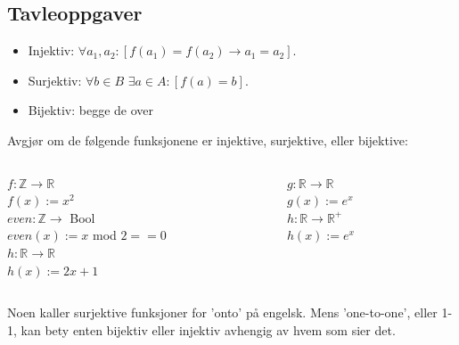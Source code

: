 \subsection{Tavleoppgaver}
\begin{frame} %
    \begin{itemize}
        \item Injektiv:  $\forall a_1, a_2 : [f(a_1) = f(a_2) \rightarrow a_1 = a_2]$.\\
        \item Surjektiv: $\forall b \in B$  $\exists a \in A : [f(a) = b]$.\\
        \item Bijektiv: begge de over \\
    \end{itemize}
    \pause
    \begin{block}{Avgjør om de følgende funksjonene er injektive, surjektive, eller bijektive:}
        \begin{columns}
            \begin{column}{0.45\textwidth}
                $f : \mathbb{Z} \rightarrow \mathbb{R}$\\
                $f(x) := x^2$\\[1mm]
                \pause
                $even : \mathbb{Z} \rightarrow $ Bool\\
                $even(x) := x$ mod $2 == 0$\\[1mm]
                \pause
                $h : \mathbb{R} \rightarrow \mathbb{R}$\\
                $h(x) := 2x + 1$\\[1mm]
            \end{column}
            \pause
            \begin{column}{0.45\textwidth}
                $g : \mathbb{R} \rightarrow \mathbb{R}$\\
                $g(x) := e^x$\\[1mm]
                \pause
                $h : \mathbb{R} \rightarrow \mathbb{R}^+$\\
                $h(x) := e^x$
            \end{column}
        \end{columns}
    \end{block}
    \pause
    Noen kaller surjektive funksjoner for 'onto' på engelsk. Mens 'one-to-one', eller 1-1, kan bety enten bijektiv eller injektiv avhengig av hvem som sier det.
\end{frame}